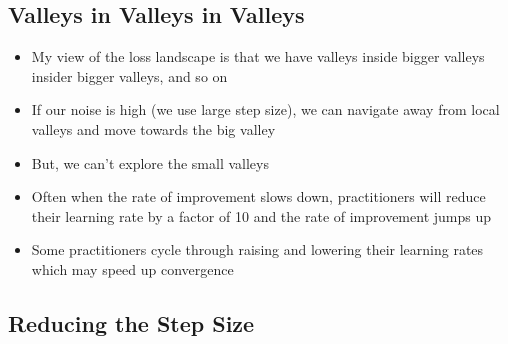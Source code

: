 
\begin{slide}
\section{Valleys in Valleys in Valleys}

\begin{PauseHighLight}
  \begin{itemize}
  \item My view of the loss landscape is that we have valleys inside
    bigger valleys insider bigger valleys, and so on\pause
  \item If our noise is high (we use large step size), we can navigate
    away from local valleys and move towards the big valley\pause
  \item But, we can't explore the small valleys\pause
  \item Often when the rate of improvement slows down, practitioners
    will reduce their learning rate by a factor of 10 and the rate of
    improvement jumps up\pause
  \item Some practitioners cycle through raising and lowering their
    learning rates which may speed up convergence\pause
  \end{itemize}
\end{PauseHighLight}

\end{slide}


\begin{slide}
\section[-2]{Reducing the Step Size}
\pb
\pause
{}
\begin{center}
  \pause
\end{center}
\begin{center}
  \pause
\end{center}

\end{slide}



